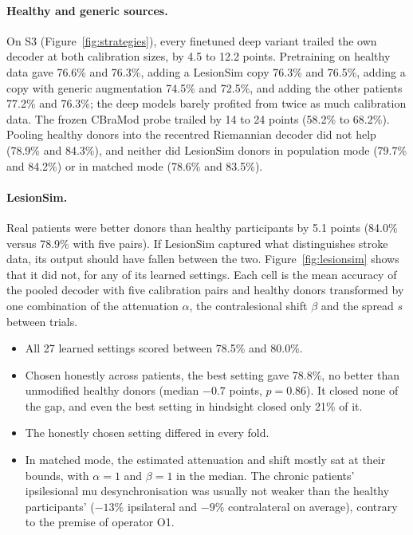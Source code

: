 \documentclass[pdflatex,sn-mathphys-num]{sn-jnl}
\begin{document}
\paragraph{Healthy and generic sources.} On S3 (Figure~\ref{fig:strategies}), every finetuned deep variant trailed the own decoder at both calibration sizes, by 4.5 to 12.2 points. Pretraining on healthy data gave 76.6\% and 76.3\%, adding a LesionSim copy 76.3\% and 76.5\%, adding a copy with generic augmentation 74.5\% and 72.5\%, and adding the other patients 77.2\% and 76.3\%; the deep models barely profited from twice as much calibration data. The frozen CBraMod probe trailed by 14 to 24 points (58.2\% to 68.2\%). Pooling healthy donors into the recentred Riemannian decoder did not help (78.9\% and 84.3\%), and neither did LesionSim donors in population mode (79.7\% and 84.2\%) or in matched mode (78.6\% and 83.5\%).

\paragraph{LesionSim.} Real patients were better donors than healthy participants by 5.1 points (84.0\% versus 78.9\% with five pairs). If LesionSim captured what distinguishes stroke data, its output should have fallen between the two. Figure~\ref{fig:lesionsim} shows that it did not, for any of its learned settings. Each cell is the mean accuracy of the pooled decoder with five calibration pairs and healthy donors transformed by one combination of the attenuation $\alpha$, the contralesional shift $\beta$ and the spread $s$ between trials.
\begin{itemize}
\item All 27 learned settings scored between 78.5\% and 80.0\%.
\item Chosen honestly across patients, the best setting gave 78.8\%, no better than unmodified healthy donors (median $-0.7$ points, $p = 0.86$). It closed none of the gap, and even the best setting in hindsight closed only 21\% of it.
\item The honestly chosen setting differed in every fold.
\item In matched mode, the estimated attenuation and shift mostly sat at their bounds, with $\alpha = 1$ and $\beta = 1$ in the median. The chronic patients' ipsilesional mu desynchronisation was usually not weaker than the healthy participants' ($-13\%$ ipsilateral and $-9\%$ contralateral on average), contrary to the premise of operator O1.
\end{itemize}
\end{document}
